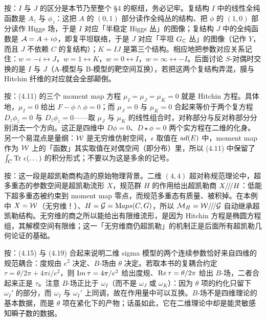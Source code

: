 \begin{yizhu}[易错点]
按：$I$ 与 $J$ 的区分是本节乃至整个 §4 的枢纽，务必记牢。复结构 $I$ 中的线性全纯函数是 $A_{\bar z}$ 与 $\phi_z$：这把 $A$ 的 $(0,1)$ 部分读作全纯丛的结构、把 $\phi$ 的 $(1,0)$ 部分读作 Higgs 场，于是 $I$ 对应「半稳定 Higgs 丛」的图像；复结构 $J$ 中的全纯函数是 $\CA=A+i\phi$，即复平坦联络，于是 $J$ 对应「平坦 $G_{\Bbb C}$ 丛」的图像（记作 $Y$，而且 $J$ 不依赖 $C$ 的复结构）；$K=IJ$ 是第三个结构。相应地把参数对应关系记住：$w=-i\leftrightarrow J$，$w=1\leftrightarrow K$，$w=0\leftrightarrow I$，$w=\infty\leftrightarrow -I$。后面讨论 $S$-对偶时交换的是 $I$ 与 $J$（A-模型与 B-模型的靶空间互换），若把这两个复结构弄混，膜与 Hitchin 纤维的对应就会全部颠倒。
\end{yizhu}

\begin{yizhu}[易错点]
按：(4.11) 的三个 moment map 方程 $\mu_I=\mu_J=\mu_K=0$ 就是 Hitchin 方程。具体地，$\mu_I=0$ 给出 $F-\phi\wedge\phi=0$；而 $\mu_J=0$ 与 $\mu_K=0$ 合起来等价于两个复方程 $D_z\phi_{\bar z}=0$ 与 $D_{\bar z}\phi_z=0$——取 $\mu_J$ 与 $\mu_K$ 的线性组合时，对称部分与反对称部分分别消去一个方向。这正是四维中 $D\phi=0$、$D\star\phi=0$ 两个实方程在二维的化身。另一个易混点是量纲：$\EUW$ 是无穷维仿射空间，$\epsilon$ 取值在 ${\rm ad}(E)$ 中，moment map 作为 $\EUW$ 上的「函数」其实取值在对偶空间（即分布）里，所以 (4.11) 中保留了 $\int_C\Tr\,\epsilon(\dots)$ 的积分形式；不要以为这是多余的记号。
\end{yizhu}

\begin{yizhu}[物理图像]
按：这一段是超凯勒商构造的原始物理背景。二维 $(4,4)$ 超对称规范理论中，超多重态的参数空间是超凯勒流形 $X$，规范群 $H$ 的作用给出超凯勒商 $X/\negthinspace/\negthinspace/H$：低能下超多重态被约束到 moment map 零点，而规范多重态有质量、被积掉。在本例中 $X=\EUW$（无穷维！）、$H={\cal G}={\rm Maps}(C,G)$，所以 $\MH=\EUW/\negthinspace/\negthinspace/{\cal G}$ 自动继承超凯勒结构。无穷维的商之所以能给出有限维流形，是因为 Hitchin 方程是椭圆方程组，其解模空间有限维；这一「无穷维商仍超凯勒」的机制正是后面所有超凯勒几何论证的基础。
\end{yizhu}

\begin{yizhu}[含糊点拨]
按：(4.15) 与 (4.19) 合起来说明二维 sigma 模型的两个连续参数恰好来自四维的规范耦合：度规由 $e^2$ 决定、$B$-场由 $\theta$ 决定。若取本书的复耦合约定 $\tau=\theta/2\pi+4\pi i/e^2$，则 ${\rm Im}\,\tau=4\pi/e^2$ 给出度规、${\rm Re}\,\tau=\theta/2\pi$ 给出 $B$-场，二者合起来正是 $\tau$。注意 $B$-场正比于 $\omega_I$（而不是 $\omega_J$ 或 $\omega_K$）：因为 $\theta$ 项的约化只留下 $\omega_I'$ 的部分，而 $\omega_I$ 与 $\omega_I'$ 上同调，故在作用量中可以互换。$B$-场不是四维理论的基本数据，而是 $\theta$ 项在紧化下的产物；话虽如此，它在二维理论中却是能灵敏感知瞬子数的数据。
\end{yizhu}

